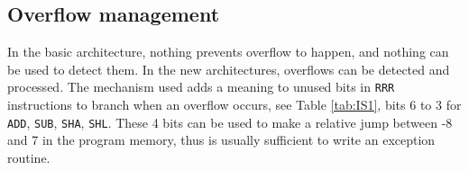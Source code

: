 \documentclass[10pt,a4paper]{article}
\theoremstyle{definition}%
\begin{document}
%
%
%
%
%
%
%

\subsection{Overflow management}
In the basic architecture, nothing prevents overflow to happen, and nothing can be used to detect them. In the new architectures, overflows can be detected and processed. The mechanism used adds a meaning to unused bits in \verb!RRR! instructions to branch when an overflow occurs, see Table \vref{tab:IS1}, bits 6 to 3 for \verb!ADD!, \verb!SUB!, \verb!SHA!, \verb!SHL!. These 4 bits can be used to make a relative jump between -8 and 7 in the program memory, thus is usually sufficient to write an exception routine.
%
\end{document}
